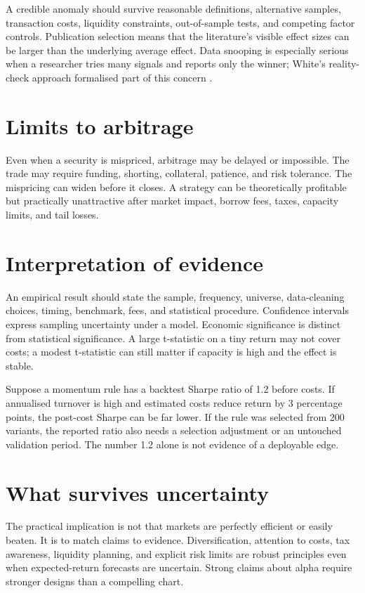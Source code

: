 A credible anomaly should survive reasonable definitions, alternative samples, transaction costs, liquidity constraints, out-of-sample tests, and competing factor controls. Publication selection means that the literature's visible effect sizes can be larger than the underlying average effect. Data snooping is especially serious when a researcher tries many signals and reports only the winner; White's reality-check approach formalised part of this concern \cite{white2000}.

\section{Limits to arbitrage}
Even when a security is mispriced, arbitrage may be delayed or impossible. The trade may require funding, shorting, collateral, patience, and risk tolerance. The mispricing can widen before it closes. A strategy can be theoretically profitable but practically unattractive after market impact, borrow fees, taxes, capacity limits, and tail losses.

\section{Interpretation of evidence}
An empirical result should state the sample, frequency, universe, data-cleaning choices, timing, benchmark, fees, and statistical procedure. Confidence intervals express sampling uncertainty under a model. Economic significance is distinct from statistical significance. A large t-statistic on a tiny return may not cover costs; a modest t-statistic can still matter if capacity is high and the effect is stable.

\begin{worked}
Suppose a momentum rule has a backtest Sharpe ratio of 1.2 before costs. If annualised turnover is high and estimated costs reduce return by 3 percentage points, the post-cost Sharpe can be far lower. If the rule was selected from 200 variants, the reported ratio also needs a selection adjustment or an untouched validation period. The number 1.2 alone is not evidence of a deployable edge.
\end{worked}

\section{What survives uncertainty}
The practical implication is not that markets are perfectly efficient or easily beaten. It is to match claims to evidence. Diversification, attention to costs, tax awareness, liquidity planning, and explicit risk limits are robust principles even when expected-return forecasts are uncertain. Strong claims about alpha require stronger designs than a compelling chart.

